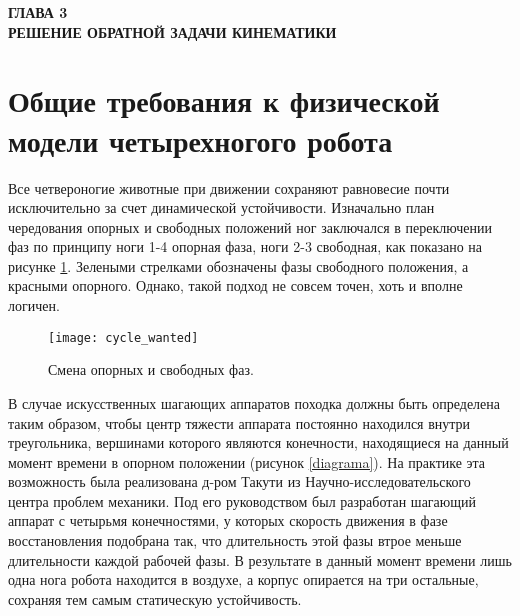 
\begin{center}
	\textbf{\large ГЛАВА 3 \\ РЕШЕНИЕ ОБРАТНОЙ ЗАДАЧИ КИНЕМАТИКИ}
\end{center}


\section{Общие требования к физической модели четырехногого робота}\label{C4_1}

Все четвероногие животные при движении сохраняют равновесие почти исключительно за счет динамической устойчивости. Изначально план чередования опорных и свободных положений ног заключался в переключении фаз по принципу ноги 1-4 опорная фаза, ноги 2-3 свободная, как показано на рисунке \ref{cycle_wanted}. Зелеными стрелками обозначены фазы свободного положения, а красными опорного. Однако, такой подход не совсем точен, хоть и вполне логичен.
\begin{figure}[h!]
	\begin{center}
		\texttt{[image: cycle\_wanted]}
		\caption{Смена опорных и свободных фаз.}
		\label{cycle_wanted}
	\end{center}
\end{figure}

В случае искусственных шагающих аппаратов походка должны быть определена таким образом, чтобы центр тяжести аппарата постоянно находился внутри треугольника, вершинами которого являются конечности, находящиеся на данный момент времени в опорном положении (рисунок \ref{diagrama}). На практике эта возможность была реализована д-ром Такути из Научно-исследовательского центра проблем механики\cite{Nakano}. Под его руководством был разработан шагающий аппарат с четырьмя конечностями, у которых скорость движения в фазе восстановления подобрана так, что длительность этой фазы втрое меньше длительности каждой рабочей фазы. В результате в данный момент времени лишь одна нога робота находится в воздухе, а корпус опирается на три остальные, сохраняя тем самым статическую устойчивость. 


